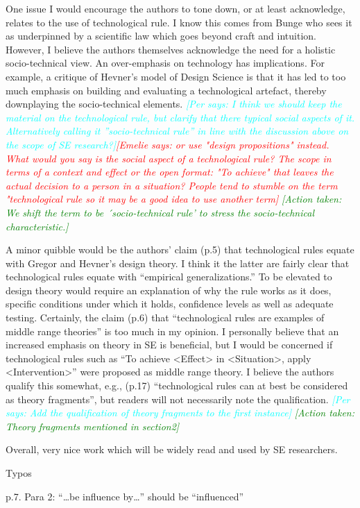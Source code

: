 \documentclass{article}
\newcommand{\emelie}[1]{\textcolor{red}{{\it [Emelie says: #1]}}}
\newcommand{\per}[1]{\textcolor{cyan}{{\it [Per says: #1]}}}
\newcommand{\action}[1]{\textcolor{green}{{\it [Action taken: #1]}}}
\newcommand{\emelie}[1]{}
\newcommand{\per}[1]{}
\newcommand{\action}[1]{}
\begin{document}
One issue I would encourage the authors to tone down, or at least acknowledge, relates to the use of technological rule. I know this comes from Bunge who sees it as underpinned by a scientific law which goes beyond craft and intuition. However, I believe the authors themselves acknowledge the need for a holistic socio-technical view. An over-emphasis on technology has implications. For example, a critique of Hevner’s model of Design Science is that it has led to too much emphasis on building and evaluating a technological artefact, thereby downplaying the socio-technical elements. \per{I think we should keep the material on the technological rule, but clarify that there typical social aspects of it. Alternatively calling it ''socio-technical rule'' in line with the discussion above on the scope of SE research?}\emelie{or use "design propositions" instead. What would you say is the social aspect of a technological rule? The scope in terms of a context and effect or the open format: "To achieve" that leaves the actual decision to a person in a situation? People tend to stumble on the term "technological rule so it may be a good idea to use another term}
\action{We shift the term to be ´socio-technical rule' to stress the socio-technical characteristic.}


A minor quibble would be the authors’ claim (p.5) that technological rules equate with Gregor and Hevner’s design theory.  I think it the latter are fairly clear that technological rules equate with “empirical generalizations.”  To be elevated to design theory would require an explanation of why the rule works as it does, specific conditions under which it holds, confidence levels as well as adequate testing. Certainly, the claim (p.6) that “technological rules are examples of middle range theories” is too much in my opinion. I personally believe that an increased emphasis on theory in SE is beneficial, but I would be concerned if technological rules such as “To achieve <Effect> in <Situation>, apply <Intervention>” were proposed as middle range theory. I believe the authors qualify this somewhat, e.g., (p.17) “technological rules can at best be considered as theory fragments”, but readers will not necessarily note the qualification. \per{Add the qualification of theory \emph{fragments} to the first instance} \action{Theory fragments mentioned in section2}
 
Overall, very nice work which will be widely read and used by SE researchers.
 

Typos
 
p.7. Para 2: “…be influence by…” should be “influenced”
 
\end{document}
